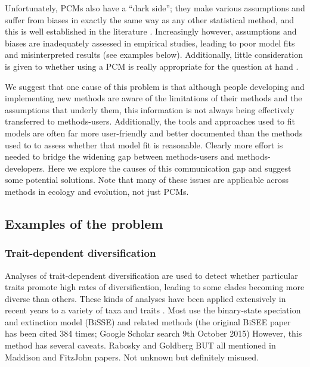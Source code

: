 \documentclass[a4paper,12pt]{article}
\begin{document}
Unfortunately, PCMs also have a ``dark side''; they make various assumptions and suffer from biases in exactly the same way as any other statistical method, and this is well established in the literature \citep[e.g.][]{freckleton2009seven,boettiger2012your,losos2011seeing,blomberg2012independent}.
Increasingly however, assumptions and biases are inadequately assessed in empirical studies, leading to poor model fits and misinterpreted results (see examples below).
Additionally, little consideration is given to whether using a PCM is really appropriate for the question at hand \citep{losos2011seeing,westoby1995misinterpreting}. 

We suggest that one cause of this problem is that although people developing and implementing new methods are aware of the limitations of their methods and the assumptions that underly them, this information is not always being effectively transferred to methods-users.
Additionally, the tools and approaches used to fit models are often far more user-friendly and better documented than the methods used to to assess whether that model fit is reasonable. 
Clearly more effort is needed to bridge the widening gap between methods-users and methods-developers. 
Here we explore the causes of this communication gap and suggest some potential solutions.
Note that many of these issues are applicable across methods in ecology and evolution, not just PCMs.

\subsection{Examples of the problem}
\subsubsection{Trait-dependent diversification} %

Analyses of trait-dependent diversification are used to detect whether particular traits promote high rates of diversification, leading to some clades becoming more diverse than others. 
These kinds of analyses have been applied extensively in recent years to a variety of taxa and traits \citep[e.g.][]{}. 
Most use the binary-state speciation and extinction model (BiSSE) and related methods (the original BiSEE paper \citealp{maddison2007estimating} has been cited 384 times; Google Scholar search 9th October 2015)
However, this method has several caveats. 
Rabosky and Goldberg BUT all mentioned in Maddison and FitzJohn papers. Not unknown but definitely misused.
\end{document}
